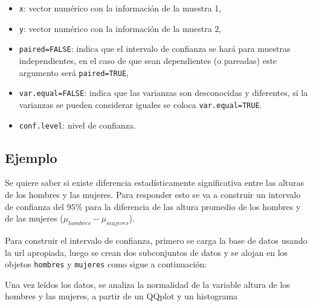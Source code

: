 \documentclass[10pt,]{krantz}
\makeatletter
\newenvironment{Shaded}{\begin{snugshade}}{\end{snugshade}}
\newcommand{\KeywordTok}[1]{\textcolor[rgb]{0.13,0.29,0.53}{\textbf{{#1}}}}
\newcommand{\DataTypeTok}[1]{\textcolor[rgb]{0.13,0.29,0.53}{{#1}}}
\newcommand{\StringTok}[1]{\textcolor[rgb]{0.31,0.60,0.02}{{#1}}}
\newcommand{\NormalTok}[1]{{#1}}
\providecommand{\tightlist}{%
  \setlength{\itemsep}{0pt}\setlength{\parskip}{0pt}}
\newenvironment{kframe}{%
\medskip{}
\setlength{\fboxsep}{.8em}
 \def\at@end@of@kframe{}%
 \ifinner\ifhmode%
  \def\at@end@of@kframe{\end{minipage}}%
  \begin{minipage}{\columnwidth}%
 \fi\fi%
 \def\FrameCommand##1{\hskip\@totalleftmargin \hskip-\fboxsep
 \colorbox{shadecolor}{##1}\hskip-\fboxsep
     \hskip-\linewidth \hskip-\@totalleftmargin \hskip\columnwidth}%
 \MakeFramed {\advance\hsize-\width
   \@totalleftmargin\z@ \linewidth\hsize
   \@setminipage}}%
 {\par\unskip\endMakeFramed%
 \at@end@of@kframe}
\renewenvironment{Shaded}{\begin{kframe}}{\end{kframe}}
\makeatother
\begin{document}
\begin{itemize}
\tightlist
\item
  \texttt{x}: vector numérico con la información de la muestra 1,
\item
  \texttt{y}: vector numérico con la información de la muestra 2,
\item
  \texttt{paired=FALSE}: indica que el intervalo de confianza se hará
  para muestras independientes, en el caso de que sean dependientes (o
  pareadas) este argumento será \texttt{paired=TRUE},
\item
  \texttt{var.equal=FALSE}: indica que las varianzas son desconocidas y
  diferentes, si la varianzas se pueden considerar iguales se coloca
  \texttt{var.equal=TRUE}.
\item
  \texttt{conf.level}: nivel de confianza.
\end{itemize}

\subsection*{Ejemplo}\label{ejemplo-54}


Se quiere saber si existe diferencia estadísticamente significativa
entre las alturas de los hombres y las mujeres. Para responder esto se
va a construir un intervalo de confianza del \(95\%\) para la diferencia
de las altura promedio de los hombres y de las mujeres
(\(\mu_{hombres}-\mu_{mujeres}\)).

Para construir el intervalo de confianza, primero se carga la base de
datos usando la url apropiada, luego se crean dos subconjuntos de datos
y se alojan en los objetos \texttt{hombres} y \texttt{mujeres} como
sigue a continuación:

\begin{Shaded}
\end{Shaded}

Una vez leídos los datos, se analiza la normalidad de la variable altura
de los hombres y las mujeres, a partir de un QQplot y un histograma
\end{document}
